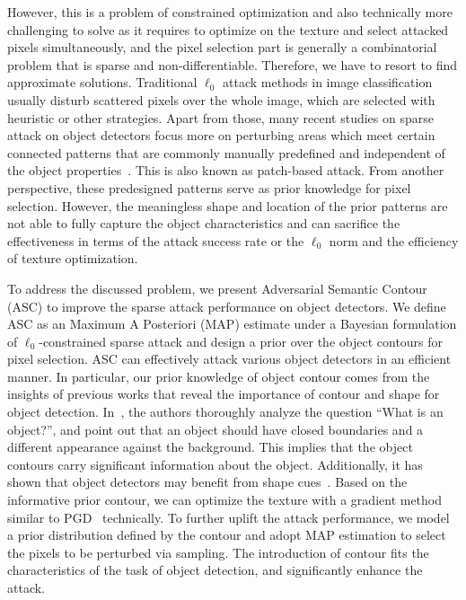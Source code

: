 \documentclass[times,twocolumn,final,authoryear]{elsarticle}
\begin{document}
However, this is a problem of constrained optimization and also technically more challenging to solve as it requires to optimize on the texture and select attacked pixels simultaneously, and the pixel selection part is generally a combinatorial problem that is sparse and non-differentiable.  %
Therefore, we have to resort to find approximate solutions. Traditional $\ell_0$ attack methods in image classification~\citep{carlini2017towards,croce2019sparse} usually disturb scattered pixels over the whole image, which are selected with heuristic or other strategies. Apart from those, many recent studies on sparse attack on object detectors focus more on perturbing areas which meet certain connected patterns that are commonly manually predefined and independent of the object properties~\citep{huang2020universal,saha2019adversarial,thys2019fooling,liu2018dpatch,wu2020dpattack,bao2020sparse}. This is also known as patch-based attack. From another perspective, these predesigned patterns serve as prior knowledge for pixel selection. However, the meaningless shape and location of the prior patterns are not able to fully capture the object characteristics and can sacrifice the effectiveness in terms of the attack success rate or the $\ell_0$ norm and the efficiency of texture optimization.



To address the discussed problem, we present Adversarial Semantic Contour (ASC) to improve the sparse attack performance on object detectors. 
We define ASC as an Maximum A Posteriori (MAP) estimate under a Bayesian formulation of $\ell_0$-constrained sparse attack and design a prior over the object contours for pixel selection. ASC can effectively attack various object detectors in an efficient manner. 
In particular, our prior knowledge of object contour comes from the insights of previous works that reveal the importance of contour and shape for object detection. In~\citep{alexe2010object}, the authors thoroughly analyze the question ``What is an object?'', 
and point out that an object should have closed boundaries and a different appearance against the background. This implies that the object contours carry significant information about the object. Additionally, it has shown that object detectors may benefit from shape cues~\citep{geirhos2018imagenet}.
Based on the informative prior contour, we can optimize the texture with a gradient method similar to PGD~\citep{madry2017towards} technically. To further uplift the attack performance, we model a prior distribution defined by the contour and adopt MAP estimation to select the pixels to be perturbed via sampling. The introduction of contour fits the characteristics of the task of object detection, and significantly enhance the attack. 
\end{document}
